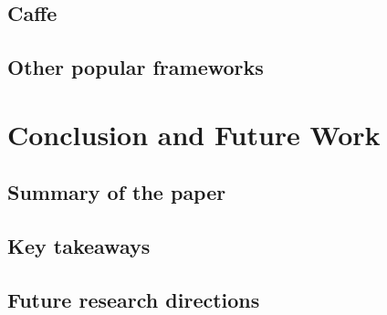 \section{Caffe}
\section{Other popular frameworks}

\chapter{Conclusion and Future Work}

\section{Summary of the paper}
\section{Key takeaways}
\section{Future research directions}
